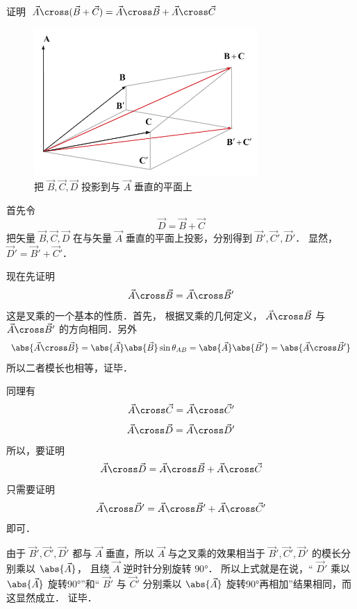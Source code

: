 
证明 $\vec A \cross (\vec B + \vec C) = \vec A \cross \vec B + \vec A \cross \vec C$ 
\begin{figure}[ht]
\vskip-10pt
\centering
\includegraphics[width=8.5cm]{./figures/CrossP1.pdf}
\caption{把 $\vec B,\vec C,\vec D$ 投影到与 $\vec A$ 垂直的平面上}
\end{figure}
首先令
\begin{equation}
\vec D = \vec B + \vec C
\end{equation}
把矢量 $\vec B,\vec C,\vec D$ 在与矢量 $\vec A$ 垂直的平面上投影，分别得到 $\vec B',\vec C',\vec D'$． 显然，$\vec D'=\vec B'+\vec C'$． 

现在先证明
\begin{equation}
\vec A \cross \vec B = \vec A \cross \vec B'
\end{equation} 
这是叉乘的一个基本的性质．首先，
根据叉乘的几何定义， $\vec A \cross \vec B$ 与
 $\vec A \cross \vec B'$ 的方向相同．另外
\begin{equation}
\abs{\vec A \cross \vec B}  = \abs{\vec A} \abs{\vec B} \sin{\theta_{AB}} = \abs{\vec A} \abs{\vec B'}=\abs{\vec A \cross \vec B'}
\end{equation}
所以二者模长也相等，证毕．

同理有 
\begin{equation}
\vec A \cross \vec C = \vec A \cross \vec C'
\end{equation}
\begin{equation}
\vec A \cross \vec D = \vec A \cross \vec D'
\end{equation}
所以，要证明
\begin{equation}
\vec A \cross \vec D = \vec A \cross \vec B + \vec A \cross \vec C
\end{equation}
只需要证明
\begin{equation}
\vec A \cross \vec D' = \vec A \cross \vec B' + \vec A \cross \vec C'
\end{equation}
即可．

由于 $\vec B', \vec C', \vec D'$ 都与 $\vec A$ 垂直，所以 $\vec A$ 与之叉乘的效果相当于 $\vec B', \vec C', \vec D'$ 的模长分别乘以 $\abs {\vec A}$， 且绕 $\vec A$ 逆时针分别旋转 $90°$． 所以上式就是在说，“ $\vec D'$ 乘以 $\abs{\vec A} $ 旋转90°”和“ $\vec B'$ 与 $\vec C'$ 分别乘以 $\abs{\vec A}$ 旋转90°再相加”结果相同，而这显然成立． 证毕．




















